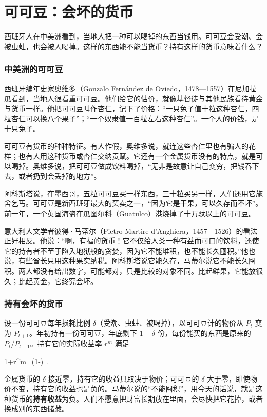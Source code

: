 \section{可可豆：会坏的货币}\label{sec:africa-cacao}

西班牙人在中美洲看到，当地人把一种可以喝掉的东西当钱用。可可豆会受潮、会被虫蛀，也会被人喝掉。这样的东西能不能当货币？持有这样的货币意味着什么？

\subsubsection{中美洲的可可豆}
西班牙编年史家奥维多（Gonzalo Fernández de Oviedo，1478—1557）在尼加拉瓜看到，当地人很看重可可豆。他们给它的估价，就像基督徒与其他民族看待黄金与货币一样。他把可可豆叫作杏仁，记下了价格：“一只兔子值十粒这种杏仁，四粒杏仁可以换八个果子”；“一个奴隶值一百粒左右这种杏仁”\cite{oviedo1851}。一个人的价钱，是十只兔子。

可可豆有货币的种种特征。有人作假，奥维多说，就连这些杏仁里也有骗人的花样；也有人用这种货币或杏仁交纳贡赋\cite{oviedo1851}。它还有一个金属货币没有的特点，就是可以喝掉。奥维多说，把可可豆做成饮料喝掉，“无非是故意让自己变穷，把钱吞下去，或者扔到会丢掉的地方”\cite{oviedo1851}。

阿科斯塔说，在墨西哥，五粒可可豆买一样东西，三十粒买另一样，人们还用它施舍乞丐。可可豆是新西班牙最大的买卖之一，“因为它是干果，可以久存而不坏”。前一年，一个英国海盗在瓜图尔科（Guatulco）港烧掉了十万驮以上的可可豆\cite{acosta1880}。

意大利人文学者彼得·马蒂尔（Pietro Martire d'Anghiera，1457—1526）的看法正好相反。他说：“啊，有福的货币！它不仅给人类一种有益而可口的饮料，还使它的持有者不至于陷入地狱般的贪婪，因为它不能堆积，也不能长久囤积。”他也说，有些酋长只用这种果实纳税\cite{martyr1912}。阿科斯塔说它能久存，马蒂尔说它不能长久囤积。两人都没有给出数字，可能都对，只是比较的对象不同。比起鲜果，它能放很久；比起黄金，它终究会坏。

\subsubsection{持有会坏的货币}
设一份可可豆每年损耗比例 $\delta$（受潮、虫蛀、被喝掉），以可可豆计的物价从 $P_t$ 变为 $P_{t+1}$。年初持有一份可可豆，年底剩下 $1-\delta$ 份，每份能买的东西是原来的 $P_t/P_{t+1}$。持有它的实际收益率 $r^{m}$ 满足
\begin{keyeq}
1+r^{m}=(1-\delta)\, .\label{eq:africa-hold}
\end{keyeq}
金属货币的 $\delta$ 接近零，持有它的收益只取决于物价；可可豆的 $\delta$ 大于零，即使物价不变，持有它的收益也是负的。马蒂尔说的“不能囤积”，用今天的话说，就是这种货币的\textbf{持有收益}为负。人们不愿意把财富长期放在里面，会尽快把它花掉，或者换成别的东西储藏。

